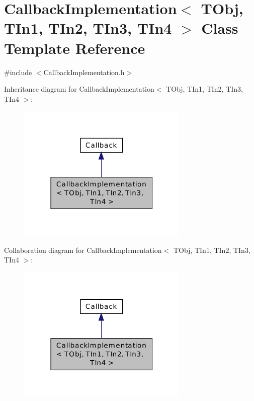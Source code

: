 \hypertarget{class_callback_implementation}{\section{Callback\-Implementation$<$ T\-Obj, T\-In1, T\-In2, T\-In3, T\-In4 $>$ Class Template Reference}
\label{class_callback_implementation}
}


{\ttfamily \#include $<$Callback\-Implementation.\-h$>$}



Inheritance diagram for Callback\-Implementation$<$ T\-Obj, T\-In1, T\-In2, T\-In3, T\-In4 $>$\-:\nopagebreak
\begin{figure}[H]
\begin{center}
\leavevmode
\includegraphics[width=230pt]{class_callback_implementation__inherit__graph}
\end{center}
\end{figure}


Collaboration diagram for Callback\-Implementation$<$ T\-Obj, T\-In1, T\-In2, T\-In3, T\-In4 $>$\-:\nopagebreak
\begin{figure}[H]
\begin{center}
\leavevmode
\includegraphics[width=230pt]{class_callback_implementation__coll__graph}
\end{center}
\end{figure}
